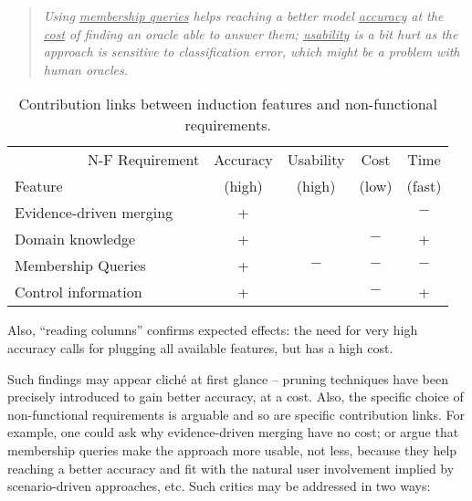 \begin{quote}\emph{Using \underline{membership queries} helps reaching a better model \underline{accuracy} at the \underline{cost} of finding an oracle able to answer them; \underline{usability} is a bit hurt as the approach is sensitive to classification error, which might be a problem with human oracles.}\end{quote}

\begin{table}[h]
\renewcommand{\arraystretch}{1.3}
\begin{center}
\begin{tabular}{| l || c | c | c | c |}
\hline
~~~~~~~~~~N-F Requirement & Accuracy &   Usability    &    Cost    &  Time   \\
Feature                   &  (high)  &     (high)     &    (low)   & (fast)  \\
\hline
\hline
Evidence-driven merging   &    +     &                &            &   $-$   \\
Domain knowledge          &    +     &                &     $-$    &   +     \\
Membership Queries        &    +     &      $-$       &     $-$    &   $-$   \\
Control information       &    +     &                &     $-$    &   +     \\
\hline
\end{tabular}
\end{center}
\caption{Contribution links between induction features and non-functional requirements.\label{table:evaluation-contribution-links}}
\end{table}

Also, ``reading columns'' confirms expected effects: the need for very high accuracy calls for plugging all available features, but has a high cost. 

Such findings may appear clich\'e at first glance -- pruning techniques have been precisely introduced to gain better accuracy, at a cost. Also, the specific choice of non-functional requirements is arguable and so are specific contribution links. For example, one could ask why evidence-driven merging have no cost; or argue that membership queries make the approach more usable, not less, because they help reaching a better accuracy and fit with the natural user involvement implied by scenario-driven approaches, etc. Such critics may be addressed in two ways:

